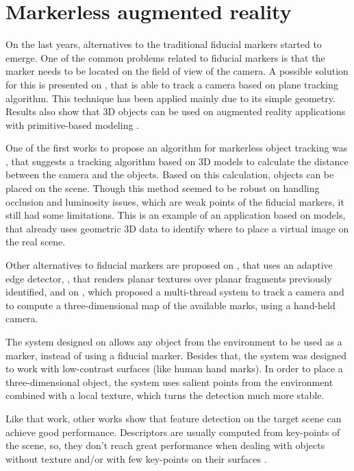 \documentclass[msc, a4paper, classic, en]{ufbathesis}
\begin{document}
\section{Markerless augmented reality}

On the last years, alternatives to the traditional fiducial markers started to emerge. One of the common problems related to fiducial markers is that the marker needs to be located on the field of view of the camera. A possible solution for this is presented on \cite{5739718}, that is able to track a camera based on plane tracking algorithm. This technique has been applied mainly due to its simple geometry. Results also show that 3D objects can be used on augmented reality applications with primitive-based modeling \cite{KimLW10}.

One of the first works to propose an algorithm for markerless object tracking was \cite{Comport03d}, that suggests a tracking algorithm based on 3D models to calculate the distance between the camera and the objects. Based on this calculation, objects can be placed on the scene. Though this method seemed to be robust on handling occlusion and luminosity issues, which are weak points of the fiducial markers, it still had some limitations. This is an example of an application based on models, that already uses geometric 3D data to identify where to place a virtual image on the real scene.

Other alternatives to fiducial markers are proposed on \cite{wuest}, that uses an adaptive edge detector, \cite{ferrari}, that renders planar textures over planar fragments previously identified, and on \cite{klein}, which proposed a multi-thread system to track a camera and to compute a three-dimensional map of the available marks, using a hand-held camera.

The system designed on \cite{ZhangL12} allows any object from the environment to be used as a marker, instead of using a fiducial marker. Besides that, the system was designed to work with low-contrast surfaces (like human hand marks). In order to place a three-dimensional object, the system uses salient points from the environment combined with a local texture, which turns the detection much more stable.

Like that work, other works show that feature detection on the target scene can achieve good performance. Descriptors are usually computed from key-points of the scene, so, they don't reach great performance when dealing with objects without texture and/or with few key-points on their surfaces \cite{bay}.
\end{document}
